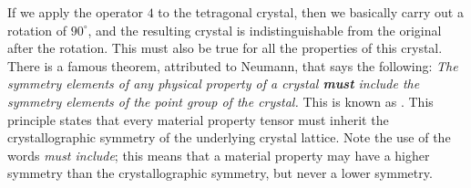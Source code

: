 If we apply the operator $4$ to the tetragonal crystal, then we basically carry out a rotation of $90^{\circ}$, and the resulting crystal is indistinguishable from the original after the rotation.  This must also be true for all the properties of this crystal.  There is a famous theorem, attributed to Neumann, that says the following:  \textit{The symmetry elements of any physical property of a crystal \textbf{must} include the symmetry elements of the point group of the crystal.}  This is known as .  This principle states that every material property tensor must inherit the crystallographic symmetry of the underlying crystal lattice.  Note the use of the words \textit{must include}; this means that a material property may have a higher symmetry than the crystallographic symmetry, but never a lower symmetry.

